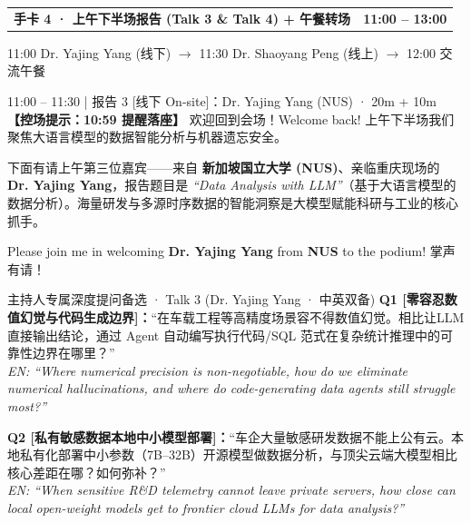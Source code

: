 \documentclass[12pt,a4paper]{article}
\makeatletter
\newcommand{\cardbanner}[3]{%
  \begin{tcolorbox}[
    enhanced, colback=nusnavy, colframe=nusnavy, arc=1.8mm,
    boxrule=0pt, left=3.8mm, right=3.8mm, top=2.1mm, bottom=2.2mm,
    before skip=0pt, after skip=2.4mm,
    borderline south={1.1mm}{0mm}{nusorange}
  ]
    \begin{tabularx}{\linewidth}{@{}X r@{}}
      {\fontsize{13.2}{16}\selectfont\color{white}\textbf{#1}} &
      {\fontsize{11.2}{14}\selectfont\color{orangebg}\textbf{#2}}
    \end{tabularx}
    \vspace{0.6mm}
    {\fontsize{9.3}{11.8}\selectfont\color{slate200}#3}
  \end{tcolorbox}
}
\newcommand{\cue}[1]{%
  {\fontsize{9.6}{12.5}\selectfont\textcolor{nusorange}{\textbf{【控场提示：#1】}}}%
}
\makeatother
\begin{document}
\cardbanner{手卡 4 · 上午下半场报告 (Talk 3 \& Talk 4) + 午餐转场}{11:00 – 13:00}{11:00 Dr. Yajing Yang (线下) $\rightarrow$ 11:30 Dr. Shaoyang Peng (线上) $\rightarrow$ 12:00 交流午餐}

\begin{scriptbox}{11:00 – 11:30 \;|\; 报告 3 [线下 On-site]：Dr. Yajing Yang (NUS) · 20m + 10m}
\fontsize{11.1}{15.8}\selectfont
\cue{10:59 提醒落座} 欢迎回到会场！Welcome back! 上午下半场我们聚焦大语言模型的数据智能分析与机器遗忘安全。\par
下面有请上午第三位嘉宾——来自 \textbf{新加坡国立大学 (NUS)}、亲临重庆现场的 \textbf{Dr. Yajing Yang}，报告题目是 \textit{``Data Analysis with LLM''}（基于大语言模型的数据分析）。海量研发与多源时序数据的智能洞察是大模型赋能科研与工业的核心抓手。\par
Please join me in welcoming \textbf{Dr. Yajing Yang} from \textbf{NUS} to the podium! 掌声有请！
\end{scriptbox}
\begin{qabox}{主持人专属深度提问备选 · Talk 3 (Dr. Yajing Yang · 中英双备)}
\fontsize{10}{14.1}\selectfont
\textbf{Q1 [零容忍数值幻觉与代码生成边界]：}“在车载工程等高精度场景容不得数值幻觉。相比让LLM直接输出结论，通过 Agent 自动编写执行代码/SQL 范式在复杂统计推理中的可靠性边界在哪里？” \\
\textit{EN: ``Where numerical precision is non-negotiable, how do we eliminate numerical hallucinations, and where do code-generating data agents still struggle most?''}\par
\textbf{Q2 [私有敏感数据本地中小模型部署]：}“车企大量敏感研发数据不能上公有云。本地私有化部署中小参数（7B–32B）开源模型做数据分析，与顶尖云端大模型相比核心差距在哪？如何弥补？” \\
\textit{EN: ``When sensitive R\&D telemetry cannot leave private servers, how close can local open-weight models get to frontier cloud LLMs for data analysis?''}
\end{qabox}
\end{document}
